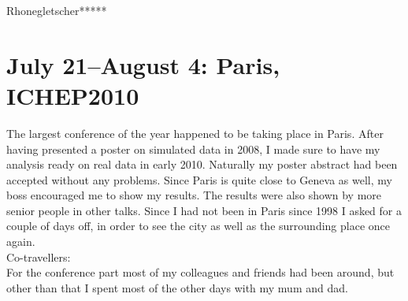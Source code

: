 Rhonegletscher*****

\section{July 21--August 4: Paris, ICHEP2010}
\label{Paris2010}

The largest conference of the year happened to be taking place in Paris. After having presented a poster on simulated data in 2008, I made sure to have my analysis ready on real data in early 2010. Naturally my poster abstract had been accepted without any problems. Since Paris is quite close to Geneva as well, my boss encouraged me to show my results. The results were also shown by more senior people in other talks. Since I had not been in Paris since 1998 I asked for a couple of days off, in order to see the city as well as the surrounding place once again.\\

Co-travellers:\\
For the conference part most of my colleagues and friends had been around, but other than that I spent most of the other days with my mum and dad.\\

